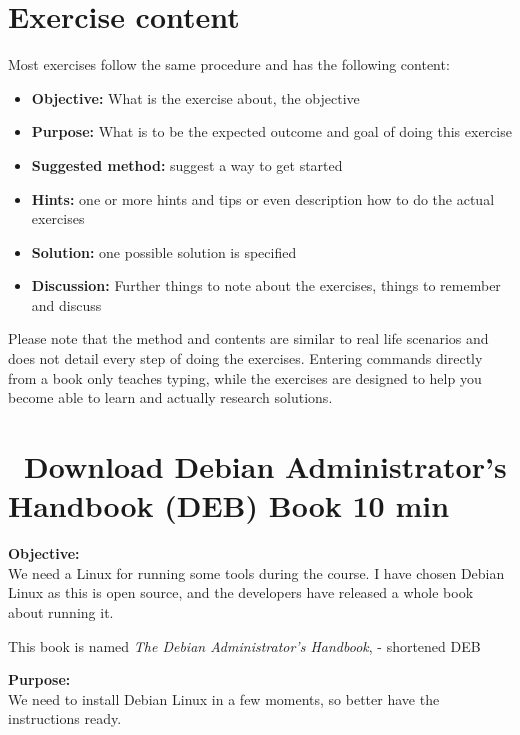 \documentclass[a4paper,11pt,notitlepage]{report}
\begin{document}

\chapter*{\color{titlecolor}Exercise content}

Most exercises follow the same procedure and has the following content:
\begin{itemize}
\item {\bf Objective:} What is the exercise about, the objective
\item {\bf Purpose:} What is to be the expected outcome and goal of doing this exercise
\item {\bf Suggested method:} suggest a way to get started
\item {\bf Hints:} one or more hints and tips or even description how to
do the actual exercises
\item {\bf Solution:} one possible solution is specified
\item {\bf Discussion:} Further things to note about the exercises, things to remember and discuss
\end{itemize}

Please note that the method and contents are similar to real life scenarios and does not detail every step of doing the exercises. Entering commands directly from a book only teaches typing, while the exercises are designed to help you become able to learn and actually research solutions.


\chapter{\faExclamationTriangle\ Download Debian Administrator’s Handbook (DEB) Book 10 min}
\label{ex:sw-downloadDEB}



{\bf Objective:}\\
We need a Linux for running some tools during the course. I have chosen Debian Linux as this is open source, and the developers have released a whole book about running it.

This book is named
\emph{The Debian Administrator’s Handbook},  - shortened DEB

{\bf Purpose:}\\
We need to install Debian Linux in a few moments, so better have the instructions ready.
\end{document}

